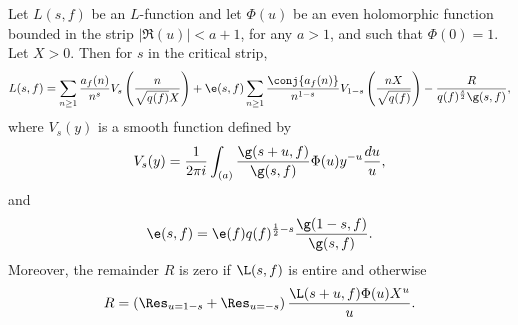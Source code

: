     \begin{theorem}
      Let $L(s,f)$ be an $L$-function and let $\Phi(u)$ be an even holomorphic function bounded in the strip $|\Re(u)| < a+1$, for any $a > 1$, and such that $\Phi(0) = 1$. Let $X > 0$. Then for $s$ in the critical strip,
      \[
        L(s,f) = \sum_{n \ge 1}\frac{a_{f}(n)}{n^{s}}V_{s}\left(\frac{n}{\sqrt{q(f)}X}\right)+\e(s,f)\sum_{n \ge 1}\frac{\conj{a_{f}(n)}}{n^{1-s}}V_{1-s}\left(\frac{nX}{\sqrt{q(f)}}\right)-\frac{R}{q(f)^{\frac{s}{2}}\g(s,f)},
      \]
      where $V_{s}(y)$ is a smooth function defined by
      \[
        V_{s}(y) = \frac{1}{2\pi i}\int_{(a)}\frac{\g(s+u,f)}{\g(s,f)}\Phi(u)y^{-u}\frac{du}{u},
      \]
      and
      \[
        \e(s,f) = \e(f)q(f)^{\frac{1}{2}-s}\frac{\g(1-s,f)}{\g(s,f)}.
      \]
      Moreover, the remainder $R$ is zero if $\L(s,f)$ is entire and otherwise
      \[
        R = \left(\Res_{u = 1-s}+\Res_{u = -s}\right)\frac{\L(s+u,f)\Phi(u)X^{u}}{u}.
      \]
    \end{theorem}
